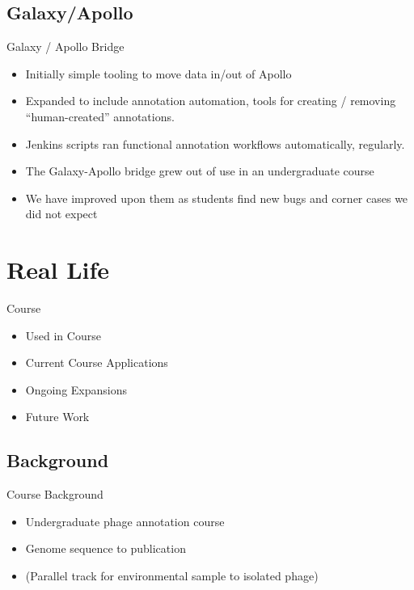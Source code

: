 \documentclass[12pt]{phage3slides} %
\begin{document}
\subsection{Galaxy/Apollo}
\begin{frame}{Galaxy / Apollo Bridge}
    \begin{itemize}
        \item Initially simple tooling to move data in/out of Apollo
        \item Expanded to include annotation automation, tools for creating / removing ``human-created'' annotations.
        \item Jenkins scripts ran functional annotation workflows automatically, regularly.
        \item The Galaxy-Apollo bridge grew out of use in an undergraduate course
        \item We have improved upon them as students find new bugs and corner cases we did not expect
    \end{itemize}
\end{frame}



\section{Real Life}
\begin{frame}{Course}
    \begin{itemize}
        \item Used in Course
        \item Current Course Applications
        \item Ongoing Expansions
        \item Future Work
    \end{itemize}
\end{frame}


\subsection{Background}
\begin{frame}{Course Background}
    \begin{itemize}
        \item Undergraduate phage annotation course
        \item Genome sequence to publication
        \item (Parallel track for environmental sample to isolated phage)
    \end{itemize}
\end{frame}
\end{document}
